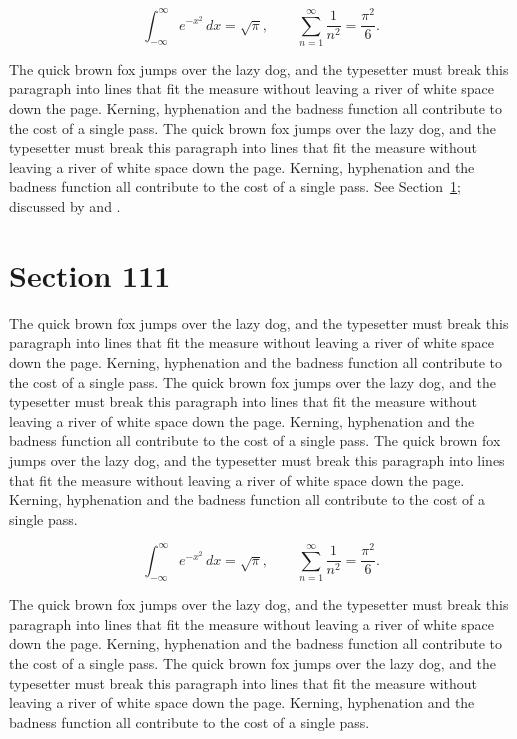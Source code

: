 \documentclass{article}
\begin{document}
\begin{equation}\label{eq:110}
\int_{-\infty}^{\infty} e^{-x^{2}}\,dx = \sqrt{\pi}, \qquad
\sum_{n=1}^{\infty} \frac{1}{n^{2}} = \frac{\pi^{2}}{6}.
\end{equation}

The quick brown fox jumps over the lazy dog, and the typesetter must break this paragraph into lines that fit the measure without leaving a river of white space down the page. Kerning, hyphenation and the badness function all contribute to the cost of a single pass. The quick brown fox jumps over the lazy dog, and the typesetter must break this paragraph into lines that fit the measure without leaving a river of white space down the page. Kerning, hyphenation and the badness function all contribute to the cost of a single pass. 
See Section~\ref{sec:111}; discussed by \textcite{k1} and \textcite{l3}.
\section{Section 111}
\label{sec:111}
The quick brown fox jumps over the lazy dog, and the typesetter must break this paragraph into lines that fit the measure without leaving a river of white space down the page. Kerning, hyphenation and the badness function all contribute to the cost of a single pass. The quick brown fox jumps over the lazy dog, and the typesetter must break this paragraph into lines that fit the measure without leaving a river of white space down the page. Kerning, hyphenation and the badness function all contribute to the cost of a single pass. The quick brown fox jumps over the lazy dog, and the typesetter must break this paragraph into lines that fit the measure without leaving a river of white space down the page. Kerning, hyphenation and the badness function all contribute to the cost of a single pass. 

\begin{equation}\label{eq:111}
\int_{-\infty}^{\infty} e^{-x^{2}}\,dx = \sqrt{\pi}, \qquad
\sum_{n=1}^{\infty} \frac{1}{n^{2}} = \frac{\pi^{2}}{6}.
\end{equation}

The quick brown fox jumps over the lazy dog, and the typesetter must break this paragraph into lines that fit the measure without leaving a river of white space down the page. Kerning, hyphenation and the badness function all contribute to the cost of a single pass. The quick brown fox jumps over the lazy dog, and the typesetter must break this paragraph into lines that fit the measure without leaving a river of white space down the page. Kerning, hyphenation and the badness function all contribute to the cost of a single pass. 
\end{document}
